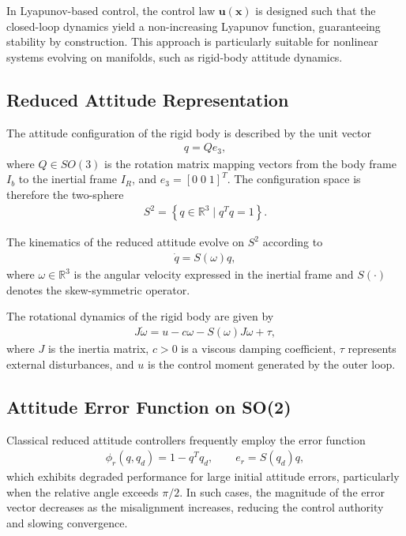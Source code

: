 In Lyapunov-based control, the control law $\mathbf{u}(\mathbf{x})$ is designed such that the closed-loop dynamics yield a non-increasing Lyapunov function, guaranteeing stability by construction. This approach is particularly suitable for nonlinear systems evolving on manifolds, such as rigid-body attitude dynamics.

\subsection{Reduced Attitude Representation}

The attitude configuration of the rigid body is described by the unit vector
\begin{align}
q = Q e_3,
\end{align}
where \( Q \in SO(3) \) is the rotation matrix mapping vectors from the body frame \( I_b \) to the inertial frame \( I_R \), and \( e_3 = [0\;0\;1]^T \).
The configuration space is therefore the two-sphere
\begin{align}
S^2 = \left\{ q \in \mathbb{R}^3 \mid q^T q = 1 \right\}.
\end{align}

The kinematics of the reduced attitude evolve on \( S^2 \) according to
\begin{align}
\dot{q} = S(\omega) q,
\end{align}
where \( \omega \in \mathbb{R}^3 \) is the angular velocity expressed in the inertial frame and \( S(\cdot) \) denotes the skew-symmetric operator.

The rotational dynamics of the rigid body are given by
\begin{align}
J \dot{\omega} = u - c \omega - S(\omega) J \omega + \tau,
\end{align}
where \( J \) is the inertia matrix, \( c > 0 \) is a viscous damping coefficient, \( \tau \) represents external disturbances, and \( u \) is the control moment generated by the outer loop.

\subsection{Attitude Error Function on SO(2)}

Classical reduced attitude controllers frequently employ the error function
\begin{align}
\phi_r(q, q_d) = 1 - q^T q_d,
\qquad
e_r = S(q_d) q,
\end{align}
which exhibits degraded performance for large initial attitude errors, particularly when the relative angle exceeds \( \pi/2 \). In such cases, the magnitude of the error vector decreases as the misalignment increases, reducing the control authority and slowing convergence.


